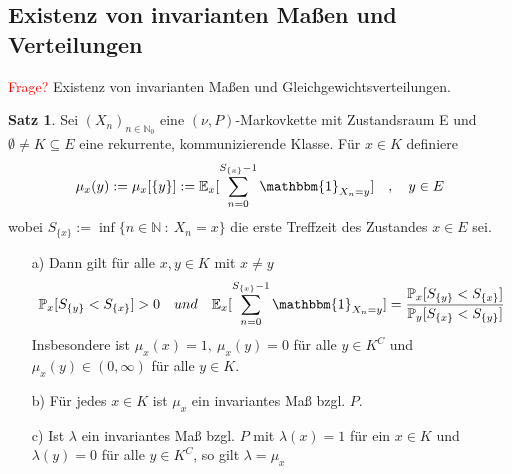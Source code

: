 \documentclass[a4paper,12pt]{scrartcl}
\theoremstyle{definition}
\newtheorem{sat}{Satz}[section]
\begin{document}
\subsection{Existenz von invarianten Maßen und Verteilungen}
\textcolor{red}{Frage?} Existenz von invarianten Maßen und Gleichgewichtsverteilungen.
\begin{sat}
\label{aufzählungen existenz von invarianten Maßen}
Sei $(X_{n})_{n \in \mathbb{N}_{0}}$ eine $(\nu,P)$-Markovkette mit Zustandsraum E und $\emptyset \neq K \subseteq E$ eine rekurrente, kommunizierende Klasse. Für $x \in K$ definiere
\begin{equation*}
\mu_{x}(y) := \mu_{x}[\lbrace y \rbrace] := \mathbb{E}_{x}[\sum_{n=0}^{S_{\lbrace x \rbrace} - 1} \mathbbm{1}_{X_{n} = y}] \quad , \quad y \in E
\end{equation*}
wobei $S_{\lbrace x \rbrace} := \inf \lbrace n \in \mathbb{N} \: : \: X_{n} = x  \rbrace$ die erste Treffzeit des Zustandes $x \in E$ sei.
\begin{itemize}
\item[a)] Dann gilt für alle $x,y \in K$ mit $x \neq y$
\begin{equation*}
\mathbb{P}_{x}[S_{\lbrace y \rbrace} < S_{\lbrace x \rbrace}] > 0 \quad und \quad \mathbb{E}_{x}[\sum_{n=0}^{S_{\lbrace x \rbrace} - 1} \mathbbm{1}_{X_{n} = y}] = \dfrac{\mathbb{P}_{x}[S_{\lbrace y \rbrace} < S_{\lbrace x \rbrace}]}{\mathbb{P}_{y}[S_{\lbrace x \rbrace} < S_{\lbrace y \rbrace}]}
\end{equation*} 
Insbesondere ist $\mu_{x}(x)=1, \: \mu_{x}(y) =0$ für alle $y \in K^{C}$ und $\mu_{x}(y) \in (0,\infty)$ für alle $y \in K$.
\item[b)] Für jedes $x \in K$ ist $\mu_{x}$ ein invariantes Maß bzgl. $P$.
\item[c)] Ist $\lambda$ ein invariantes Maß bzgl. $P$ mit $\lambda(x) =1$ für ein $x \in K$ und $\lambda(y) = 0$ für alle $y \in K^{C}$, so gilt $\lambda = \mu_{x}$ 
\end{itemize}
\end{sat}
\end{document}
